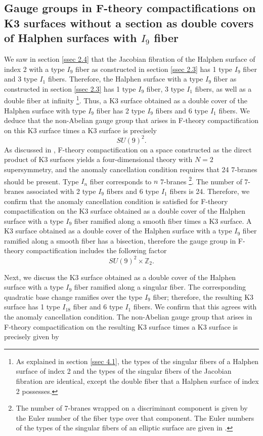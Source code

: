 \documentclass[12pt]{article}
\def\Z{\mathbb{Z}}
\begin{document}
\subsection{Gauge groups in F-theory compactifications on K3 surfaces without a section as double covers of Halphen surfaces with $I_9$ fiber}
\label{ssec 3.3}
We saw in section \ref{ssec 2.4} that the Jacobian fibration of the Halphen surface of index 2 with a type $I_9$ fiber as constructed in section \ref{ssec 2.3} has 1 type $I_9$ fiber and 3 type $I_1$ fibers. Therefore, the Halphen surface with a type $I_9$ fiber as constructed in section \ref{ssec 2.3} has 1 type $I_9$ fiber, 3 type $I_1$ fibers, as well as a double fiber at infinity \footnote{As explained in section \ref{ssec 4.1}, the types of the singular fibers of a Halphen surface of index 2 and the types of the singular fibers of the Jacobian fibration are identical, except the double fiber that a Halphen surface of index 2 possesses.}. Thus, a K3 surface obtained as a double cover of the Halphen surface with type $I_9$ fiber has 2 type $I_9$ fibers and 6 type $I_1$ fibers. We deduce that the non-Abelian gauge group that arises in F-theory compactification on this K3 surface times a K3 surface is precisely
\begin{equation}
SU(9)^2.
\end{equation}
As discussed in \cite{K}, F-theory compactification on a space constructed as the direct product of K3 surfaces yields a four-dimensional theory with $N=2$ supersymmetry, and the anomaly cancellation condition requires that 24 7-branes should be present. Type $I_n$ fiber corresponds to $n$ 7-branes \footnote{The number of 7-branes wrapped on a discriminant component is given by the Euler number of the fiber type over that component. The Euler numbers of the types of the singular fibers of an elliptic surface are given in \cite{Kod2}.}. The number of 7-branes associated with 2 type $I_9$ fibers and 6 type $I_1$ fibers is 24. Therefore, we confirm that the anomaly cancellation condition is satisfied for F-theory compactification on the K3 surface obtained as a double cover of the Halphen surface with a type $I_9$ fiber ramified along a smooth fiber times a K3 surface. A K3 surface obtained as a double cover of the Halphen surface with a type $I_9$ fiber ramified along a smooth fiber has a bisection, therefore the gauge group in F-theory compactification includes the following factor
\begin{equation}
SU(9)^2 \times \Z_2.
\end{equation}
\par Next, we discuss the K3 surface obtained as a double cover of the Halphen surface with a type $I_9$ fiber ramified along a singular fiber. The corresponding quadratic base change ramifies over the type $I_9$ fiber; therefore, the resulting K3 surface has 1 type $I_{18}$ fiber and 6 type $I_1$ fibers. We confirm that this agrees with the anomaly cancellation condition. The non-Abelian gauge group that arises in F-theory compactification on the resulting K3 surface times a K3 surface is precisely given by
\end{document}
